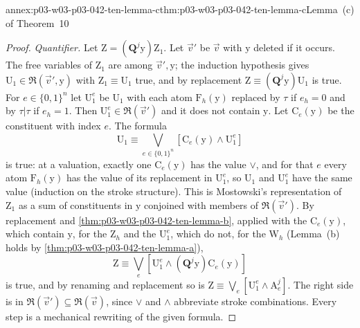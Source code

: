 \begin{annexitem}{annex:p03-w03-p03-042-ten-lemma-c}{thm:p03-w03-p03-042-ten-lemma-c}{Lemma~(c) of Theorem~10}
\begin{proof}
\emph{Quantifier.}  Let \(\mathrm Z=(\mathbf Q^j\mathrm y)\mathrm Z_1\).
Let \(\vec v'\) be \(\vec v\) with \(\mathrm y\) deleted if it occurs.
The free variables of \(\mathrm Z_1\) are among \(\vec v',\mathrm y\);
the induction hypothesis gives \(\mathrm U_1\in\mathfrak R(\vec v',
\mathrm y)\) with \(\mathrm Z_1\equiv\mathrm U_1\) true, and by
replacement \(\mathrm Z\equiv(\mathbf Q^j\mathrm y)\mathrm U_1\) is true.
For \(e\in\{0,1\}^n\) let \(\mathrm U_1^e\) be \(\mathrm U_1\) with each
atom \(\mathrm F_h(\mathrm y)\) replaced by \(\tau\) if \(e_h=0\) and by
\(\tau|\tau\) if \(e_h=1\).  Then \(\mathrm U_1^e\in\mathfrak R(\vec v')\)
and it does not contain \(\mathrm y\).  Let \(\mathrm C_e(\mathrm y)\) be
the constituent with index \(e\).  The formula
\[
 \mathrm U_1\equiv\bigvee_{e\in\{0,1\}^n}[\mathrm C_e(\mathrm y)\wedge
 \mathrm U_1^e]
\]
is true: at a valuation, exactly one \(\mathrm C_e(\mathrm y)\) has the
value \(\vee\), and for that \(e\) every atom \(\mathrm F_h(\mathrm y)\)
has the value of its replacement in \(\mathrm U_1^e\), so \(\mathrm U_1\)
and \(\mathrm U_1^e\) have the same value (induction on the stroke
structure).  This is Mostowski's representation of \(\mathrm Z_1\) as a
sum of constituents in \(\mathrm y\) conjoined with members of
\(\mathfrak R(\vec v')\).  By replacement and
\cref{thm:p03-w03-p03-042-ten-lemma-b}, applied with the \(\mathrm
C_e(\mathrm y)\), which contain \(\mathrm y\), for the \(\mathrm Z_h\)
and the \(\mathrm U_1^e\), which do not, for the \(\mathrm W_h\) (Lemma~(b)
holds by \cref{thm:p03-w03-p03-042-ten-lemma-a}),
\[
 \mathrm Z\equiv\bigvee_{e}[\mathrm U_1^e\wedge(\mathbf Q^j\mathrm y)
 \mathrm C_e(\mathrm y)]
\]
is true, and by renaming and replacement so is \(\mathrm Z\equiv
\bigvee_e[\mathrm U_1^e\wedge\mathrm A^j_e]\).  The right side is in
\(\mathfrak R(\vec v')\subseteq\mathfrak R(\vec v)\), since \(\vee\) and
\(\wedge\) abbreviate stroke combinations.  Every step is a mechanical
rewriting of the given formula.
\end{proof}
\end{annexitem}

